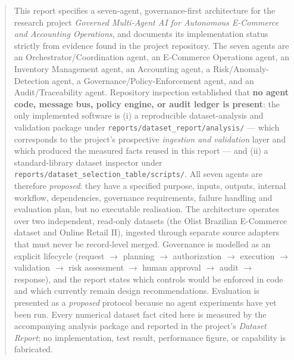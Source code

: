 \documentclass[11pt,a4paper]{article}
\newcommand{\code}[1]{\texttt{#1}}
\begin{document}
\begin{abstract}
\noindent
This report specifies a seven-agent, governance-first architecture for the research project \emph{Governed Multi-Agent AI for Autonomous E-Commerce and Accounting Operations}, and documents its implementation status strictly from evidence found in the project repository. The seven agents are an Orchestrator/Coordination agent, an E-Commerce Operations agent, an Inventory Management agent, an Accounting agent, a Risk/Anomaly-Detection agent, a Governance/Policy-Enforcement agent, and an Audit/Traceability agent. Repository inspection established that \textbf{no agent code, message bus, policy engine, or audit ledger is present}: the only implemented software is (i) a reproducible dataset-analysis and validation package under \code{reports/dataset\_report/analysis/} --- which corresponds to the project's prospective \emph{ingestion and validation} layer and which produced the measured facts reused in this report --- and (ii) a standard-library dataset inspector under \code{reports/dataset\_selection\_table/scripts/}. All seven agents are therefore \emph{proposed}: they have a specified purpose, inputs, outputs, internal workflow, dependencies, governance requirements, failure handling and evaluation plan, but no executable realisation. The architecture operates over two independent, read-only datasets (the Olist Brazilian E-Commerce dataset and Online Retail II), ingested through separate source adapters that must never be record-level merged. Governance is modelled as an explicit lifecycle (request $\rightarrow$ planning $\rightarrow$ authorization $\rightarrow$ execution $\rightarrow$ validation $\rightarrow$ risk assessment $\rightarrow$ human approval $\rightarrow$ audit $\rightarrow$ response), and the report states which controls would be enforced in code and which currently remain design recommendations. Evaluation is presented as a \emph{proposed} protocol because no agent experiments have yet been run. Every numerical dataset fact cited here is measured by the accompanying analysis package and reported in the project's \emph{Dataset Report}; no implementation, test result, performance figure, or capability is fabricated.
\end{abstract}

\tableofcontents
\clearpage

\end{document}
